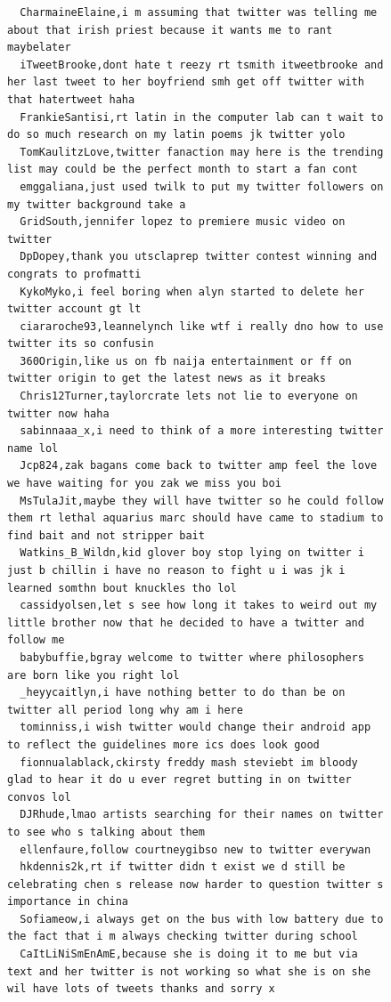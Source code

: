 \begin{figure}[htpb]
\begin{verbatim}
  CharmaineElaine,i m assuming that twitter was telling me about that irish priest because it wants me to rant maybelater
  iTweetBrooke,dont hate t reezy rt tsmith itweetbrooke and her last tweet to her boyfriend smh get off twitter with that hatertweet haha
  FrankieSantisi,rt latin in the computer lab can t wait to do so much research on my latin poems jk twitter yolo
  TomKaulitzLove,twitter fanaction may here is the trending list may could be the perfect month to start a fan cont
  emggaliana,just used twilk to put my twitter followers on my twitter background take a
  GridSouth,jennifer lopez to premiere music video on twitter
  DpDopey,thank you utsclaprep twitter contest winning and congrats to profmatti
  KykoMyko,i feel boring when alyn started to delete her twitter account gt lt
  ciararoche93,leannelynch like wtf i really dno how to use twitter its so confusin
  360Origin,like us on fb naija entertainment or ff on twitter origin to get the latest news as it breaks
  Chris12Turner,taylorcrate lets not lie to everyone on twitter now haha
  sabinnaaa_x,i need to think of a more interesting twitter name lol
  Jcp824,zak bagans come back to twitter amp feel the love we have waiting for you zak we miss you boi
  MsTulaJit,maybe they will have twitter so he could follow them rt lethal aquarius marc should have came to stadium to find bait and not stripper bait
  Watkins_B_Wildn,kid glover boy stop lying on twitter i just b chillin i have no reason to fight u i was jk i learned somthn bout knuckles tho lol
  cassidyolsen,let s see how long it takes to weird out my little brother now that he decided to have a twitter and follow me
  babybuffie,bgray welcome to twitter where philosophers are born like you right lol
  _heyycaitlyn,i have nothing better to do than be on twitter all period long why am i here
  tominniss,i wish twitter would change their android app to reflect the guidelines more ics does look good
  fionnualablack,ckirsty freddy mash steviebt im bloody glad to hear it do u ever regret butting in on twitter convos lol
  DJRhude,lmao artists searching for their names on twitter to see who s talking about them
  ellenfaure,follow courtneygibso new to twitter everywan
  hkdennis2k,rt if twitter didn t exist we d still be celebrating chen s release now harder to question twitter s importance in china
  Sofiameow,i always get on the bus with low battery due to the fact that i m always checking twitter during school
  CaItLiNiSmEnAmE,because she is doing it to me but via text and her twitter is not working so what she is on she wil have lots of tweets thanks and sorry x

\end{verbatim}
\end{figure}
